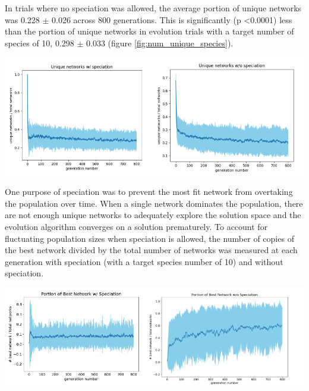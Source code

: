 \documentclass[12pt]{report}
\begin{document}
In trials where no speciation was allowed, the average portion of unique networks was 0.228 $\pm$ 0.026 across 800 generations. This is significantly (p \textless 0.0001) less than the portion of unique networks in evolution trials with a target number of species of 10, 0.298 $\pm$ 0.033 (figure \ref{fig:num_unique_species}).

\begin{center}
    \includegraphics[width=18cm]{images/num_unique_networks.png}
    \label{fig:num_unique_species}
\end{center}

One purpose of speciation was to prevent the most fit network from overtaking the population over time. When a single network dominates the population, there are not enough unique networks to adequately explore the solution space and the evolution algorithm converges on a solution prematurely. To account for fluctuating population sizes when speciation is allowed, the number of copies of the best network divided by the total number of networks was measured at each generation with speciation (with a target species number of 10) and without speciation.  

  

\begin{center}
    \includegraphics[width=18cm]{images/portion_best_network.png}
    \label{fig:num_unique_species}
\end{center}
\end{document}

